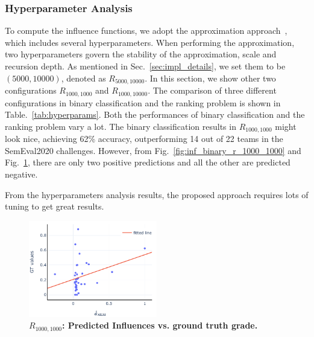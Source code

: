 \subsubsection{Hyperparameter Analysis}
To compute the influence functions, we adopt the approximation approach~\cite{second-order-approx}, which includes several hyperparameters.
When performing the approximation, two hyperparameters govern the stability of the approximation, scale and recursion depth. 
As mentioned in Sec.~\ref{sec:impl_details}, we set them to be $(5000, 10000)$, denoted as $R_{5000, 10000}$.
In this section, we show other two configurations $R_{1000, 1000}$ and $R_{1000, 10000}$.
The comparison of three different configurations in binary classification and the ranking problem is shown in Table.~\ref{tab:hyperparams}.
Both the performances of binary classification and the ranking problem vary a lot.
The binary classification results in $R_{1000, 1000}$ might look nice, achieving 62\% accuracy, outperforming 14 out of 22 teams in the SemEval2020 challenges.
However, from Fig.~\ref{fig:inf_binary_r_1000_1000} and Fig.~\ref{fig:inf_scatter_r_1000_1000}, there are only two positive predictions and all the other are predicted negative. 

From the hyperparameters analysis results, the proposed approach requires lots of tuning to get great results.


\begin{table}[t]
\centering
{}
\caption{\textbf{Comparison between different hyperparameters configurations.}}
\label{tab:hyperparams}
\end{table}





\begin{figure}[t]
\centering
\includegraphics[width=0.5\textwidth]{../project/src/scale_1000-recursion_depth_1000/influences_grade_scatter.pdf}
\caption{\textbf{$R_{1000, 1000}$: Predicted Influences vs. ground truth grade.}}
\label{fig:inf_scatter_r_1000_1000}
\end{figure}
